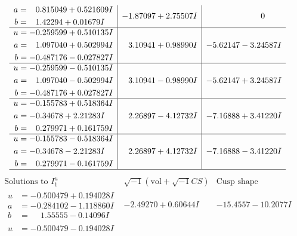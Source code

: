 \documentclass[1p]{elsarticle_modified}
\theoremstyle{definition}
\newcommand{\I}{\sqrt{-1}}
\begin{document}
$$\begin{array}{c|c|c}
\begin{aligned}
a &= \phantom{-}0.815049 + 0.521609 I \\
b &= \phantom{-}1.42294 + 0.01679 I\end{aligned}
 & -1.87097 + 2.75507 I & \phantom{-0.000000 } 0 \\ \hline\begin{aligned}
u &= -0.259599 + 0.510135 I \\
a &= \phantom{-}1.097040 + 0.502994 I \\
b &= -0.487176 - 0.027827 I\end{aligned}
 & \phantom{-}3.10941 + 0.98990 I & -5.62147 - 3.24587 I \\ \hline\begin{aligned}
u &= -0.259599 - 0.510135 I \\
a &= \phantom{-}1.097040 - 0.502994 I \\
b &= -0.487176 + 0.027827 I\end{aligned}
 & \phantom{-}3.10941 - 0.98990 I & -5.62147 + 3.24587 I \\ \hline\begin{aligned}
u &= -0.155783 + 0.518364 I \\
a &= -0.34678 + 2.21283 I \\
b &= \phantom{-}0.279971 + 0.161759 I\end{aligned}
 & \phantom{-}2.26897 - 4.12732 I & -7.16888 + 3.41220 I \\ \hline\begin{aligned}
u &= -0.155783 - 0.518364 I \\
a &= -0.34678 - 2.21283 I \\
b &= \phantom{-}0.279971 - 0.161759 I\end{aligned}
 & \phantom{-}2.26897 + 4.12732 I & -7.16888 - 3.41220 I\\
 \hline 
 \end{array}$$\newpage$$\begin{array}{c|c|c}  
\text{Solutions to }I^u_{1}& \I (\text{vol} + \sqrt{-1}CS) & \text{Cusp shape}\\
 \hline 
\begin{aligned}
u &= -0.500479 + 0.194028 I \\
a &= -0.284102 - 1.118860 I \\
b &= \phantom{-}1.55555 - 0.14096 I\end{aligned}
 & -2.49270 + 0.60644 I & -15.4557 - 10.2077 I \\ \hline\begin{aligned}
u &= -0.500479 - 0.194028 I \\

\end{aligned}
\end{array}$$
\end{document}
